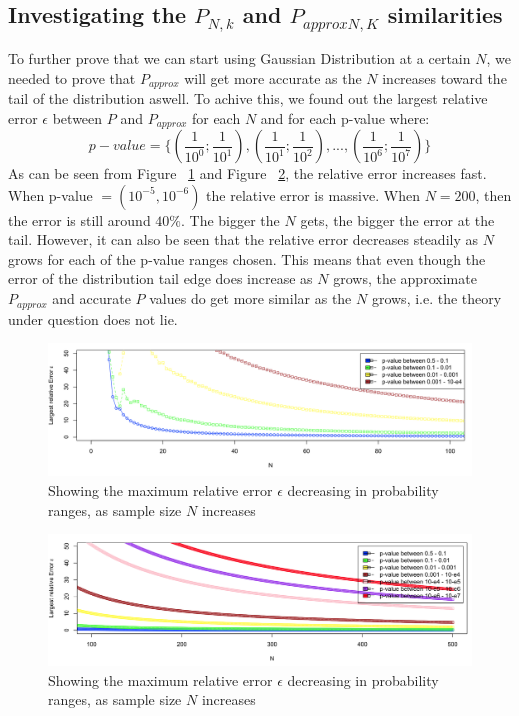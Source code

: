 \documentclass[12pt]{article}
\begin{document}
\subsection{Investigating the $P_{N, k}$ and $P_{approx N, K}$ similarities}
To further prove that we can start using Gaussian Distribution at a certain $N$, we needed to prove that $P_{approx}$ will get more accurate as the $N$ increases toward the tail of the distribution aswell. To achive this, we found out the largest relative error $\epsilon$ between $P$ and $P_{approx}$ for each $N$ and for each p-value where:
\begin{equation}
  p-value=\{(\frac{1}{10^0};\frac{1}{10^1}), (\frac{1}{10^1};\frac{1}{10^2}), ..., (\frac{1}{10^{6}};\frac{1}{10^{7}}) \}
\end{equation}
As can be seen from Figure ~\ref{fig:LargestApproxPRelativeError0_100} and Figure ~\ref{fig:LargestApproxPRelativeError100_500}, the relative error increases fast. When p-value $= (10^{-5}, 10^{-6})$ the relative error is massive. When $N=200$, then the error is still around $40\%$. The bigger the $N$ gets, the bigger the error at the tail. However, it can also be seen that the relative error decreases steadily as $N$ grows for each of the p-value ranges chosen. This means that even though the error of the distribution tail edge does increase as $N$ grows, the approximate $P_{approx}$ and accurate $P$ values do get more similar as the $N$ grows, i.e. the theory under question does not lie.

\begin{figure}[H]
  \centering
  \includegraphics[width=1\textwidth]{LargestApproxPRelativeError0_100}
  \caption{Showing the maximum relative error $\epsilon$ decreasing in probability ranges, as sample size $N$ increases}
  \label{fig:LargestApproxPRelativeError0_100}
\end{figure}

\begin{figure}[H]
  \centering
  \includegraphics[width=1\textwidth]{LargestApproxPRelativeError100_500}
  \caption{Showing the maximum relative error $\epsilon$ decreasing in probability ranges, as sample size $N$ increases}
  \label{fig:LargestApproxPRelativeError100_500}
\end{figure}
\end{document}
